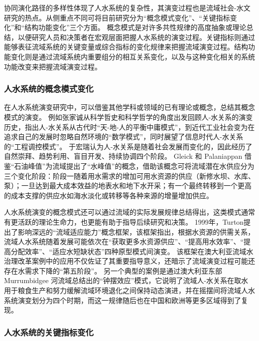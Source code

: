 协同演化路径的多样性体现了人水系统的复杂性，其演变过程也是流域社会-水文研究的热点。从侧重点不同可将目前研究分为“概念模式变化”、“关键指标变化”和“结构功能变化”三个方面。
概念模式是对许多共性规律的高度抽象或理论总结，以便研究人员和决策者在宏观层面把握人水系统的演变过程。关键指标则通过能够表征流域系统的关键变量或综合指标的变化规律来把握流域演变过程。结构功能变化则是通过流域系统内重要组分的相互关系变化，以及与这种变化相关的系统功能改变来把握流域演变过程。

\subsubsection{人水系统的概念模式变化}

在人水系统演变研究中，可以借鉴其他学科或领域的已有理论或概念，总结其概念模式的演变。
例如张家诚从科学哲史和科学哲学的角度出发回顾人-水关系的演变历史，指出人-水关系从古代时“天-地-人的平衡中庸模式”，到近代工业社会变为在追求自己的发展时忽略自然环境的“数学模式”，同时展望了信息时代人-水关系的“工程调控模式”\cite{zhang2006}。
于宏瑞认为人-水关系是随着社会发展而变化的，因此经历了自然崇拜、趋势利用、盲目开发、持续协调四个阶段\cite{yuruihong2011}。
Gleick 和 Palaniappan 借鉴“石油峰值”为流域提出了“水峰值”的概念，借助该概念可将流域潜在水供应分为三个变化阶段：阶段一随着用水需求的增加可用水资源的供应（新修水坝、水库、泵）；一旦达到最大成本效益的地表水和地下水开采；有一个最终转移到一个更高的成本支撑的供应水如海水淡化或转移等各种来源的增量增加供应\cite{gleick2010}。

人水系统演变的概念模式还可以通过流域的实际发展规律总结得出，这类模式通常有更活跃的理论生命力，也更能有助于指导后续研究和决策。
1999年，Turton提出了影响深远的“流域适应能力”概念框架，该框架指出，根据水资源的供需关系，流域人水系统随着发展可能依次在“获取更多水资源供应”、“提高用水效率”、“提高分配效率”、“适应水短缺状态”四种原型模式间演变\cite{turton1999}。
该框架在澳大利亚流域水治理改革案例中的应用不仅佐证了其重要指导意义，还暗示了流域演变过程可能还存在水需求下降的“第五阶段”\cite{loch2020}。
另一个典型的案例是通过澳大利亚东部 Murrumbidgee 河流域总结出的“钟摆效应”模式，它说明了流域人-水关系在取水用于粮食生产和努力缓解流域环境退化之间保持动态演进，并在摇摆间将流域人水系统演变划分为四个时期\cite{kandasamy2014, roobavannan2017}，而这一规律随后也在中国和欧洲等更多区域得到了复现\cite{han2017, mostert2018}。

\subsubsection{人水系统的关键指标变化}

